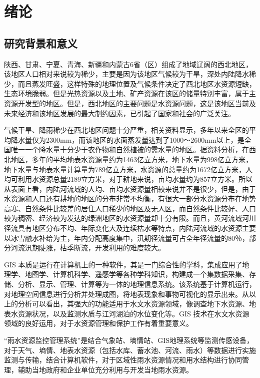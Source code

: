 
\chapter{绪论}

\section{研究背景和意义}

陕西、甘肃、宁夏、青海、新疆和内蒙古6省（区）组成了地域辽阔的西北地区，该地区人口相对来说较为稀少，主要是因为该地区气候较为干旱，深处内陆降水稀少，而且蒸发旺盛，这样特殊的地理位置及气候条件决定了西北地区水资源短缺\cite{黄智煌邬娜-2}，生态环境脆弱。但是光热资源以及土地、矿产资源在该区的储量特别丰富，属于主资源开发型的地区。但是，西北地区的主要问题是水资源问题，这是该地区当前及未来经济和该地区发展的最大制约因素，已引起了国家和社会的广泛关注。

气候干旱、降雨稀少在西北地区问题十分严重，相关资料显示，多年以来全区的平均降水量仅为2300mm，而该地区的水面蒸发量达到了1000～2600mm以上，是全国唯一一个降水量十分少于农作物和自然植被的需水量的地区。据资料分析\cite{仇巍巍陈从喜-1}，在西北地区，多年的平均地表水资源量约为1463亿立方米，地下水量为998亿立方米，地下水量与地表水量计算量为789亿立方米，水资源的总量约为1672亿立方米，人均可利用水资源总量2189立方米，对于耕地来说，亩均水量约为857立方米。所以从表面上看，内陆河流域的人均、亩均水资源量相较来说并不是很少，但是，由于水资源和人口还有耕地的地区的分布非常不均衡，有很大一部分水资源分布在地势高寒、自然条件比较差的居住人口稀少的地区及无人区，而自然条件比较好、人口较为稠密、经济较为发达的绿洲地区的水资源量却十分有限。而且，黄河流域河川径流具有地区分布不均、年际变化大及连续枯水等特点，内陆河流域的水资源主要以冰雪融水补给为主，年内分配高度集中，汛期径流量可占全年径流量的80％，部分河流汛期陡涨，枯季断流，开发利用的难度较大。


GIS 本质是运行在计算机上的一种软件，其是一门综合性的学科，集成应用了地理学、地图学、计算机科学、遥感学等各种学科知识，构建成一个集数据采集、存储、分析、显示、管理、计算等为一体的地理信息系统\cite{张国治韩景琦-3}。该系统基于计算机运行，对地理空间信息进行分析并处理成图，将地表现象和事物可视化的显示出来。从以上的分析可以看出，其强大的功能适用于水文水资源领域，像调查地下水资源、地表水资源状况，以及监测水质与江河湖泊的水位变化等。GIS 技术在水文水资源领域的良好运用，对于水资源管理和保护工作有着重要意义。

“雨水资源监控管理系统”是结合气象站、墒情站、GIS地理系统等监测传感设备，对于天气、墒情、地表水资源（包括水库、蓄水池、河流、雨水）等数据进行实施监测与传输，结合计算机软件，对于区域性雨水资源情况和用水结构进行协同管理，辅助当地政府和企业单位充分利用与开发当地雨水资源。

